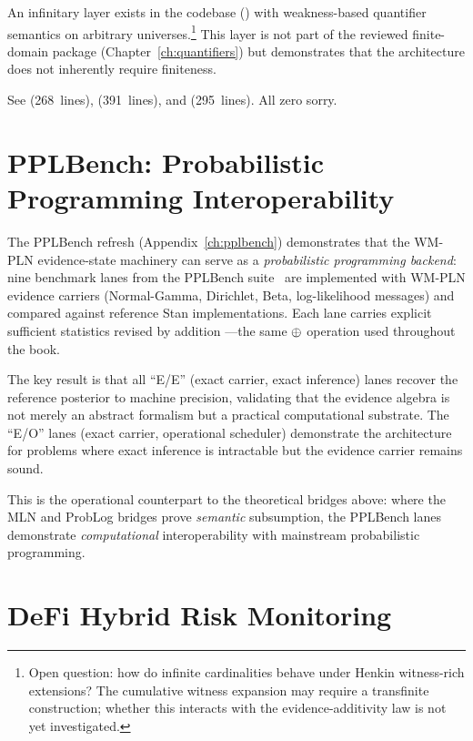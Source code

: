 \documentclass[11pt,openany]{report}
\begin{document}
An infinitary layer exists in the codebase
() with weakness-based quantifier
semantics on arbitrary universes.\footnote{Open question: how do infinite
cardinalities behave under Henkin witness-rich extensions?  The
cumulative witness expansion may require a transfinite construction;
whether this interacts with the evidence-additivity law is not yet
investigated.}  This layer is not part of the reviewed finite-domain
package (Chapter~\ref{ch:quantifiers}) but demonstrates that the
architecture does not inherently require finiteness.

\medskip
\noindent
See  (268~lines),
 (391~lines),
and 
(295~lines).  All zero sorry.


\section{PPLBench: Probabilistic Programming Interoperability}
\label{sec:pplbench-bridge}

The PPLBench refresh (Appendix~\ref{ch:pplbench}) demonstrates that the
WM-PLN evidence-state machinery can serve as a \emph{probabilistic
programming backend}: nine benchmark lanes from the PPLBench
suite~\cite{Lao2021PPLBench} are implemented with WM-PLN
evidence carriers (Normal-Gamma, Dirichlet, Beta, log-likelihood
messages) and compared against reference Stan implementations.
Each lane carries explicit sufficient statistics revised by addition
---the same $\oplus$ operation used throughout the book.

The key result is that all ``E/E'' (exact carrier, exact inference)
lanes recover the reference posterior to machine precision, validating
that the evidence algebra is not merely an abstract formalism but a
practical computational substrate.  The ``E/O'' lanes (exact carrier,
operational scheduler) demonstrate the architecture for problems where
exact inference is intractable but the evidence carrier remains sound.

This is the operational counterpart to the theoretical bridges above:
where the MLN and ProbLog bridges prove \emph{semantic} subsumption,
the PPLBench lanes demonstrate \emph{computational} interoperability
with mainstream probabilistic programming.


\section{DeFi Hybrid Risk Monitoring}
\end{document}
